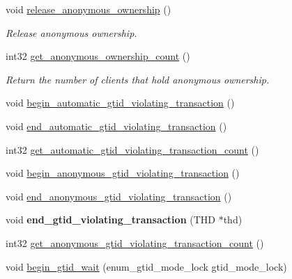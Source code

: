 \begin{DoxyCompactItemize}
\mbox{\label{classGtid__state_aedf31ed3dbdbab7cf4ce39de1ca51bee}} 
void \mbox{\hyperlink{classGtid__state_aedf31ed3dbdbab7cf4ce39de1ca51bee}{release\+\_\+anonymous\+\_\+ownership}} ()
\begin{DoxyCompactList}\small\item\em Release anonymous ownership. \end{DoxyCompactList}\item 
\mbox{\label{classGtid__state_ae1612d90e7c0a0f6fec94b9a05e12fbf}} 
int32 \mbox{\hyperlink{classGtid__state_ae1612d90e7c0a0f6fec94b9a05e12fbf}{get\+\_\+anonymous\+\_\+ownership\+\_\+count}} ()
\begin{DoxyCompactList}\small\item\em Return the number of clients that hold anonymous ownership. \end{DoxyCompactList}\item 
void \mbox{\hyperlink{classGtid__state_abda6d7defb7e4a1477c7a33ce8ee1263}{begin\+\_\+automatic\+\_\+gtid\+\_\+violating\+\_\+transaction}} ()
\item 
void \mbox{\hyperlink{classGtid__state_a138d09ad92a3df53b57f065b6535d7a0}{end\+\_\+automatic\+\_\+gtid\+\_\+violating\+\_\+transaction}} ()
\item 
int32 \mbox{\hyperlink{classGtid__state_a954b493111b1b2a7ad049db64eefe050}{get\+\_\+automatic\+\_\+gtid\+\_\+violating\+\_\+transaction\+\_\+count}} ()
\item 
void \mbox{\hyperlink{classGtid__state_a315fbccbb1afe3414b5ef732027d2af6}{begin\+\_\+anonymous\+\_\+gtid\+\_\+violating\+\_\+transaction}} ()
\item 
void \mbox{\hyperlink{classGtid__state_ad56fbf5a2c062a5b2db3eab4444c2f2f}{end\+\_\+anonymous\+\_\+gtid\+\_\+violating\+\_\+transaction}} ()
\item 
\mbox{\label{classGtid__state_ab9e16543dafff485d212b494adb5dffb}} 
void {\bfseries end\+\_\+gtid\+\_\+violating\+\_\+transaction} (T\+HD $\ast$thd)
\item 
int32 \mbox{\hyperlink{classGtid__state_a77271375b558d3f23317b10752fec8bd}{get\+\_\+anonymous\+\_\+gtid\+\_\+violating\+\_\+transaction\+\_\+count}} ()
\item 
void \mbox{\hyperlink{classGtid__state_ab955f90f6b725047427f721154020ea5}{begin\+\_\+gtid\+\_\+wait}} (enum\+\_\+gtid\+\_\+mode\+\_\+lock gtid\+\_\+mode\+\_\+lock)

\end{DoxyCompactItemize}
